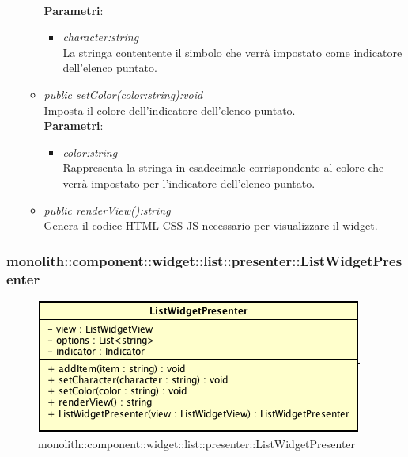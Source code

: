 \begin{itemize}
\begin{itemize}
		\\ \textbf{Parametri}: \begin{itemize}
		\item \textit{character:string}\\
		La stringa contentente il simbolo che verrà impostato come indicatore dell'elenco puntato.
		\end{itemize} 
	\item \textit{public setColor(color:string):void}\\
	Imposta il colore dell'indicatore dell'elenco puntato.
		\\ \textbf{Parametri}: \begin{itemize}
		\item \textit{color:string}\\
		Rappresenta la stringa in esadecimale corrispondente al colore che verrà impostato per l'indicatore dell'elenco puntato.
		\end{itemize} 
	\item \textit{public renderView():string}\\
	Genera il codice HTML CSS JS necessario per visualizzare il widget.
	\end{itemize}
\end{itemize}

\subsubsection{monolith::component::widget::list::presenter::ListWidgetPresenter}

\label{monolith::component::widget::list::presenter::ListWidgetPresenter}
\begin{figure}[H]
	\centering
	\includegraphics[scale=0.5]{Sezioni/SottosezioniST/img/ListWidgetPresenter.png}
	\caption{monolith::component::widget::list::presenter::ListWidgetPresenter}
\end{figure}


